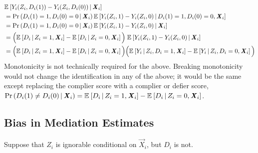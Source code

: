 \begin{align*}
    & \Egiven{ Y_i(Z_i, D_i(1)) - Y_i(Z_i, D_i(0))}{\vec X_i} \\
    & = \Probgiven{D_i(1) = 1, D_i(0) = 0}{\vec X_i}
        \Egiven{ Y_i(Z_i, 1) - Y_i(Z_i, 0)}{D_i(1) = 1, D_i(0) = 0, \vec X_i} \\
    & = \Probgiven{D_i(1) = 1, D_i(0) = 0}{\vec X_i}
        \Egiven{ Y_i(Z_i, 1) - Y_i(Z_i, 0)}{\vec X_i} \\
    & = \Big( \Egiven{D_i}{Z_i = 1, \vec X_i} - \Egiven{D_i}{Z_i = 0, \vec X_i}
        \Big) \; \Egiven{ Y_i(Z_i, 1) - Y_i(Z_i, 0)}{\vec X_i} \\
    & = \Big( \Egiven{D_i}{Z_i = 1, \vec X_i} - \Egiven{D_i}{Z_i = 0, \vec X_i}
        \Big)
        \Big( \Egiven{Y_i}{Z_i, D_i = 1, \vec X_i}
            - \Egiven{Y_i}{Z_i, D_i = 0, \vec X_i} \Big)
\end{align*}
Monotonicity is not technically required for the above.
Breaking monotonicity would not change the identification in any of the above; it would be the same except replacing the complier score with a complier or defier score, $\Probgiven{D_i(1) \neq D_i(0)}{\vec X_i} = \Egiven{D_i}{Z_i = 1, \vec X_i} - \Egiven{D_i}{Z_i = 0, \vec X_i}$.


% 
%

\subsection{Bias in Mediation Estimates}
\label{appendix:mediation-bias}
Suppose that $Z_i$ is ignorable conditional on $\vec X_i$, but $D_i$ is not.

